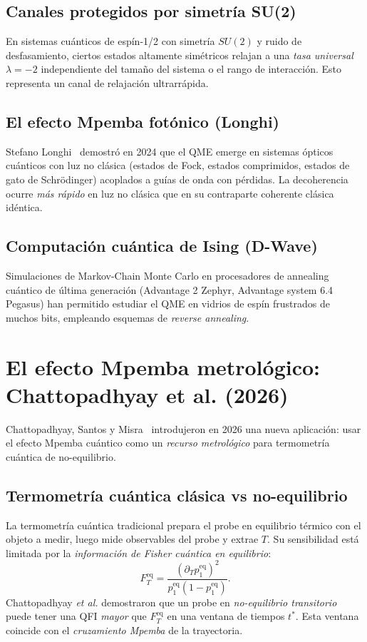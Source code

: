 \subsection{Canales protegidos por simetría SU(2)}

En sistemas cuánticos de espín-1/2 con simetría $SU(2)$ y ruido de desfasamiento, 
ciertos estados altamente simétricos relajan a una \emph{tasa universal} 
$\lambda = -2$ independiente del tamaño del sistema o el rango de interacción. 
Esto representa un canal de relajación ultrarrápida.

\subsection{El efecto Mpemba fotónico (Longhi)}

Stefano Longhi~\cite{longhi2024} demostró en 2024 que el QME emerge en sistemas 
ópticos cuánticos con luz no clásica (estados de Fock, estados comprimidos, 
estados de gato de Schrödinger) acoplados a guías de onda con pérdidas. La 
decoherencia ocurre \emph{más rápido} en luz no clásica que en su contraparte 
coherente clásica idéntica.

\subsection{Computación cuántica de Ising (D-Wave)}

Simulaciones de Markov-Chain Monte Carlo en procesadores de annealing cuántico 
de última generación (Advantage 2 Zephyr, Advantage system 6.4 Pegasus) han 
permitido estudiar el QME en vidrios de espín frustrados de muchos bits, 
empleando esquemas de \emph{reverse annealing}.

\section{El efecto Mpemba metrológico: Chattopadhyay et al. (2026)}

Chattopadhyay, Santos y Misra~\cite{chattopadhyay2026} introdujeron en 2026 una 
nueva aplicación: usar el efecto Mpemba cuántico como un \emph{recurso 
metrológico} para termometría cuántica de no-equilibrio.

\subsection{Termometría cuántica clásica vs no-equilibrio}

La termometría cuántica tradicional prepara el probe en equilibrio térmico con 
el objeto a medir, luego mide observables del probe y extrae $T$. Su 
sensibilidad está limitada por la \emph{información de Fisher cuántica en 
equilibrio}:
\begin{equation}
    F_{T}^{\mathrm{eq}} = \frac{(\partial_{T} p_1^{\mathrm{eq}})^2}{p_1^{\mathrm{eq}} (1 - p_1^{\mathrm{eq}})}.
\end{equation}
%
\noindent Chattopadhyay \emph{et al.} demostraron que un probe en 
\emph{no-equilibrio transitorio} puede tener una QFI \emph{mayor} que 
$F_{T}^{\mathrm{eq}}$ en una ventana de tiempos $t^{\ast}$. Esta ventana 
coincide con el \emph{cruzamiento Mpemba} de la trayectoria.

